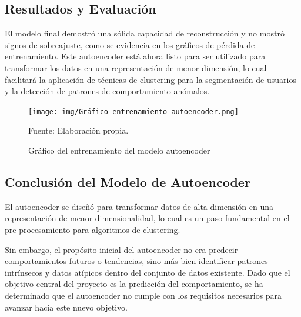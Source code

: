 \subsection{Resultados y Evaluación}

El modelo final demostró una sólida capacidad de reconstrucción y no mostró signos de sobreajuste, como se evidencia en los gráficos de pérdida de entrenamiento. Este autoencoder está ahora listo para ser utilizado para transformar los datos en una representación de menor dimensión, lo cual facilitará la aplicación de técnicas de clustering para la segmentación de usuarios y la detección de patrones de comportamiento anómalos.

\begin{figure}[H]
    \begin{minipage}[t]{0.9\textwidth}
        \caption{Gráfico del entrenamiento del modelo autoencoder}
        \label{gráfico_autoencoder}        
    \end{minipage}

    \vspace{10pt}

    \begin{minipage}[b]{0.9\textwidth}
        \centering
        \texttt{[image: img/Gráfico entrenamiento autoencoder.png]}        
    \end{minipage}

    \begin{minipage}[t]{0.9\textwidth}
        Fuente: Elaboración propia.
    \end{minipage}
\end{figure}

\subsection{Conclusión del Modelo de Autoencoder}

El autoencoder se diseñó para transformar datos de alta dimensión en una representación de menor dimensionalidad, lo cual es un paso fundamental en el pre-procesamiento para algoritmos de clustering.

Sin embargo, el propósito inicial del autoencoder no era predecir comportamientos futuros o tendencias, sino más bien identificar patrones intrínsecos y datos atípicos dentro del conjunto de datos existente. Dado que el objetivo central del proyecto es la predicción del comportamiento, se ha determinado que el autoencoder no cumple con los requisitos necesarios para avanzar hacia este nuevo objetivo.

